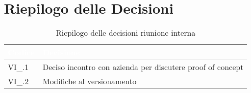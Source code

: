\section{Riepilogo delle Decisioni}


\begin{table}[!htbp]
\renewcommand{\arraystretch}{1.5}
\begin{tabular}{m{}<{\centering}  m{}<{\centering}}
\rowcolor{darkblue} \textcolor{white}{\textbf{Codice}} & \textcolor{white}{\textbf{Decisione}} \\
\hline
VI\_\D{}.1 & Deciso incontro con azienda per discutere proof of concept \\
\rowcolor{gray!10} VI\_\D{}.2 & Modifiche al versionamento \\
\end{tabular}
\caption{Riepilogo delle decisioni riunione interna \D{}}
\end{table}